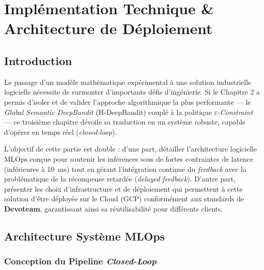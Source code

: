 
\chapter{Implémentation Technique \& Architecture de Déploiement}
\label{chap:implementation}

\section*{Introduction}

Le passage d'un modèle mathématique expérimental à une solution industrielle logicielle nécessite de surmonter d'importants défis d'ingénierie. Si le Chapitre 2 a permis d'isoler et de valider l'approche algorithmique la plus performante --- le \textit{Global Semantic DeepBandit} (H-DeepBandit) couplé à la politique $\varepsilon$-\textit{Constraint} --- ce troisième chapitre dévoile sa traduction en un système robuste, capable d'opérer en temps réel (\textit{closed-loop}).

L'objectif de cette partie est double : d'une part, détailler l'architecture logicielle MLOps conçue pour soutenir les inférences sous de fortes contraintes de latence (inférieures à 10~ms) tout en gérant l'intégration continue du \textit{feedback} avec la problématique de la récompense retardée (\textit{delayed feedback}). D'autre part, présenter les choix d'infrastructure et de déploiement qui permettent à cette solution d'être déployée sur le Cloud (GCP) conformément aux standards de \textbf{Devoteam}, garantissant ainsi sa réutilisabilité pour différents clients.


\section{Architecture Système MLOps}
\label{sec:architecture_mlops}

\subsection{Conception du Pipeline \textit{Closed-Loop}}


